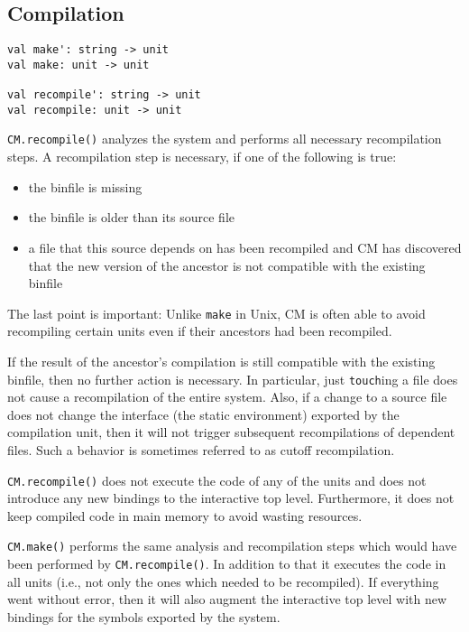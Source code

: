 \documentclass{article}
\begin{document}
\subsection{Compilation}

\begin{verbatim}
val make': string -> unit
val make: unit -> unit

val recompile': string -> unit
val recompile: unit -> unit
\end{verbatim}

{\tt CM.recompile()} analyzes the system and performs all necessary
recompilation steps.  A recompilation step is necessary, if one of
the following is true:
{\samepage

\begin{itemize}
\item the binfile is missing
\item the binfile is older than its source file
\item a file that this source depends on has been recompiled and
CM has discovered that the new version of the ancestor is not
compatible with the existing binfile
\end{itemize}
}

The last point is important: Unlike {\tt make} in {\sc Unix}, CM is
often able to avoid recompiling certain units even if their ancestors
had been recompiled.

If the result of the ancestor's compilation is still compatible with
the existing binfile, then no further action is necessary.  In
particular, just {\tt touch}ing a file does not cause a recompilation
of the entire system.  Also, if a change to a source file does not
change the interface (the static environment) exported by the
compilation unit, then it will not trigger subsequent recompilations
of dependent files.  Such a behavior is sometimes referred to as
cutoff recompilation.

{\tt CM.recompile()} does not execute the code of any of the units
and does not introduce any new bindings to the interactive top level.
Furthermore, it does not keep compiled code in main memory to avoid
wasting resources.

{\tt CM.make()} performs the same analysis and recompilation steps
which would have been performed by {\tt CM.recompile()}.  In addition
to that it executes the code in all units (i.e., not only the
ones which needed to be recompiled). If everything went without
error, then it will also augment the interactive top level with new
bindings for the symbols exported by the system.
\end{document}

